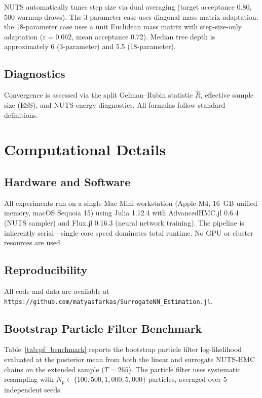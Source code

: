 \documentclass[12pt]{article}
\theoremstyle{plain}
\theoremstyle{definition}
\theoremstyle{remark}
\begin{document}
NUTS automatically tunes step size via dual averaging (target acceptance 0.80, 500 warmup draws). The 3-parameter case uses diagonal mass matrix adaptation; the 18-parameter case uses a unit Euclidean mass matrix with step-size-only adaptation ($\varepsilon = 0.062$, mean acceptance 0.72). Median tree depth is approximately 6 (3-parameter) and 5.5 (18-parameter).


\subsection{Diagnostics}

Convergence is assessed via the split Gelman--Rubin statistic $\hat{R}$, effective sample size (ESS), and NUTS energy diagnostics. All formulas follow standard definitions.


\section{Computational Details}
\label{app:computational}

\subsection{Hardware and Software}

All experiments run on a single Mac Mini workstation (Apple M4, 16~GB unified memory, macOS Sequoia 15) using Julia 1.12.4 with AdvancedHMC.jl 0.6.4 (NUTS sampler) and Flux.jl 0.16.3 (neural network training). The pipeline is inherently serial---single-core speed dominates total runtime. No GPU or cluster resources are used.

\subsection{Reproducibility}

All code and data are available at \texttt{https://github.com/matyasfarkas/SurrogateNN\_Estimation.jl}.

\subsection{Bootstrap Particle Filter Benchmark}
\label{app:pf_benchmark}

Table~\ref{tab:pf_benchmark} reports the bootstrap particle filter log-likelihood evaluated at the posterior mean from both the linear and surrogate NUTS-HMC chains on the extended sample ($T = 265$). The particle filter uses systematic resampling \citep{gordon1993novel} with $N_p \in \{100, 500, 1{,}000, 5{,}000\}$ particles, averaged over 5 independent seeds.
\end{document}
